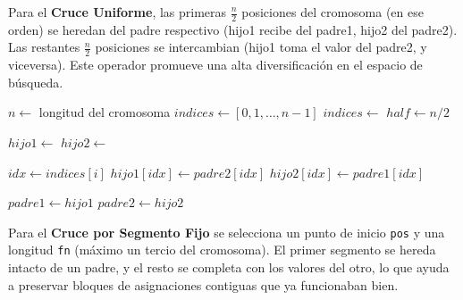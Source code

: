 \documentclass[a4paper,12pt]{article}%
\begin{document}
Para el \textbf{Cruce Uniforme}, las primeras $\frac{n}{2}$ posiciones del cromosoma (en ese orden) se heredan del padre respectivo (hijo1 recibe del padre1, hijo2 del padre2). Las restantes $\frac{n}{2}$ posiciones se intercambian (hijo1 toma el valor del padre2, y viceversa). Este operador promueve una alta diversificación en el espacio de búsqueda.


\begin{algorithm}
	\begin{algorithmic}
		\State $n \leftarrow$ longitud del cromosoma
		\State $indices \leftarrow [0,1,\ldots,n-1]$
		\State $indices \leftarrow$ 
		\State $half \leftarrow n/2$
		
		\State $hijo1 \leftarrow$ 
		\State $hijo2 \leftarrow$ 
		
		\State $idx \leftarrow indices[i]$
		\State $hijo1[idx] \leftarrow padre2[idx]$
		\State $hijo2[idx] \leftarrow padre1[idx]$
		\EndFor
		
		\State $padre1 \leftarrow hijo1$
		\State $padre2 \leftarrow hijo2$
		
		\State {}
		\State {}
		\EndFunction
	\end{algorithmic}
\end{algorithm}

Para el \textbf{Cruce por Segmento Fijo} se selecciona un punto de inicio \texttt{pos} y una longitud \texttt{fn} (máximo un tercio del cromosoma). El primer segmento se hereda intacto de un padre, y el resto se completa con los valores del otro, lo que ayuda a preservar bloques de asignaciones contiguas que ya funcionaban bien.
\end{document}
